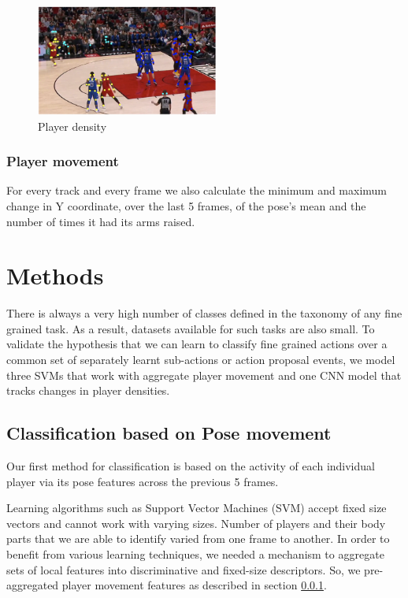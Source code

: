 \documentclass{article}
\begin{document}
\begin{figure}[ht]
\begin{center}
\centerline{\includegraphics[width=6cm]{player_density.png}}
\caption{Player density}
\label{fig:e2e}
\end{center}
\vskip -0.2in
\end{figure}

\subsubsection{Player movement}
\label{player_movement}
For every track and every frame we also calculate the minimum and maximum change in Y coordinate, over the last 5 frames, of the pose's mean and the number of times it had its arms raised.

\section{Methods}
\label{methods}

There is always a very high number of classes defined in the taxonomy of any fine grained task. As a result, datasets available for such tasks are also small. To validate the hypothesis that we can learn to classify fine grained actions over a common set of separately learnt sub-actions or action proposal events, we model three SVMs that work with aggregate player movement and one CNN model that tracks changes in player densities. 

\subsection{Classification based on Pose movement}
Our first method for classification is based on the activity of each individual player via its pose features across the previous 5 frames.

Learning algorithms such as Support Vector Machines (SVM) accept fixed size vectors and cannot work with varying sizes. Number of players and their body parts that we are able to identify varied from one frame to another. In order to benefit from various learning techniques, we needed a mechanism to aggregate sets of local features into discriminative and fixed-size descriptors. So, we pre-aggregated player movement features as described in section \ref{player_movement}.
\end{document}
